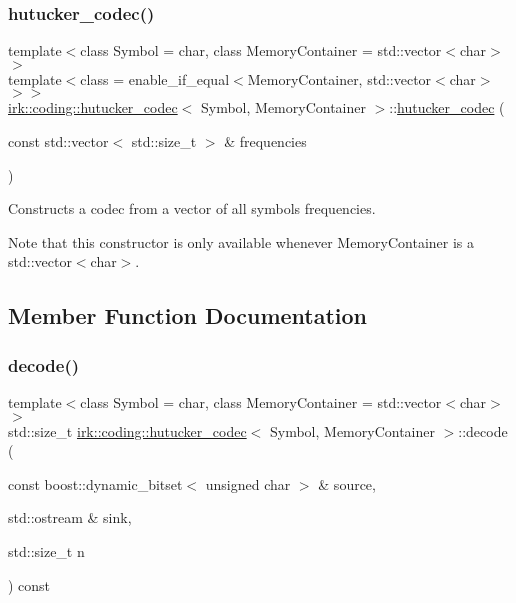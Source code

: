 \subsubsection{\texorpdfstring{hutucker\+\_\+codec()}{hutucker\_codec()}\hspace{0.1cm}{\footnotesize\ttfamily [2/2]}}
{\footnotesize\ttfamily template$<$class Symbol  = char, class Memory\+Container  = std\+::vector$<$char$>$$>$ \\
template$<$class  = enable\+\_\+if\+\_\+equal$<$\+Memory\+Container, std\+::vector$<$char$>$$>$$>$ \\
\mbox{\hyperlink{classirk_1_1coding_1_1hutucker__codec}{irk\+::coding\+::hutucker\+\_\+codec}}$<$ Symbol, Memory\+Container $>$\+::\mbox{\hyperlink{classirk_1_1coding_1_1hutucker__codec}{hutucker\+\_\+codec}} (\begin{DoxyParamCaption}\item[{const std\+::vector$<$ std\+::size\+\_\+t $>$ \&}]{frequencies }\end{DoxyParamCaption})\hspace{0.3cm}{\ttfamily [inline]}}



Constructs a codec from a vector of all symbols\textquotesingle{} frequencies. 

Note that this constructor is only available whenever {\ttfamily Memory\+Container} is a {\ttfamily std\+::vector$<$char$>$}. 

\subsection{Member Function Documentation}
\mbox{\label{classirk_1_1coding_1_1hutucker__codec_a888f087a0e3f164fdc79447af8be45d6}} 
\subsubsection{\texorpdfstring{decode()}{decode()}\hspace{0.1cm}{\footnotesize\ttfamily [1/2]}}
{\footnotesize\ttfamily template$<$class Symbol  = char, class Memory\+Container  = std\+::vector$<$char$>$$>$ \\
std\+::size\+\_\+t \mbox{\hyperlink{classirk_1_1coding_1_1hutucker__codec}{irk\+::coding\+::hutucker\+\_\+codec}}$<$ Symbol, Memory\+Container $>$\+::decode (\begin{DoxyParamCaption}\item[{const boost\+::dynamic\+\_\+bitset$<$ unsigned char $>$ \&}]{source,  }\item[{std\+::ostream \&}]{sink,  }\item[{std\+::size\+\_\+t}]{n }\end{DoxyParamCaption}) const\hspace{0.3cm}{\ttfamily [inline]}}



